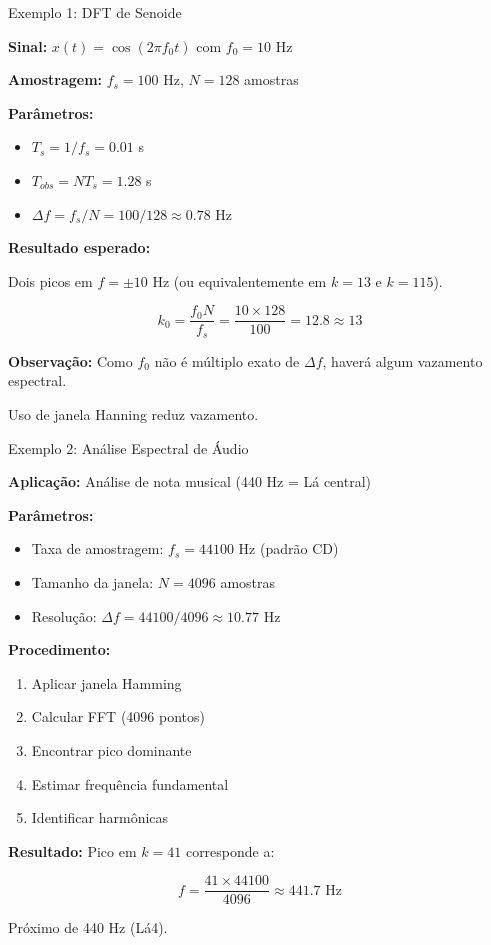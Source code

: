 \begin{frame}{Exemplo 1: DFT de Senoide}

\textbf{Sinal:} $x(t) = \cos(2\pi f_0 t)$ com $f_0 = 10$ Hz

\textbf{Amostragem:} $f_s = 100$ Hz, $N = 128$ amostras

\textbf{Parâmetros:}

\begin{itemize}
\item $T_s = 1/f_s = 0.01$ s
\item $T_{obs} = NT_s = 1.28$ s
\item $\Delta f = f_s/N = 100/128 \approx 0.78$ Hz
\end{itemize}

\textbf{Resultado esperado:}

Dois picos em $f = \pm 10$ Hz (ou equivalentemente em $k = 13$ e $k = 115$).

\[
k_0 = \frac{f_0 N}{f_s} = \frac{10 \times 128}{100} = 12.8 \approx 13
\]

\textbf{Observação:} Como $f_0$ não é múltiplo exato de $\Delta f$, haverá algum vazamento espectral.

Uso de janela Hanning reduz vazamento.

\end{frame}


\begin{frame}{Exemplo 2: Análise Espectral de Áudio}

\textbf{Aplicação:} Análise de nota musical (440 Hz = Lá central)

\textbf{Parâmetros:}

\begin{itemize}
\item Taxa de amostragem: $f_s = 44100$ Hz (padrão CD)
\item Tamanho da janela: $N = 4096$ amostras
\item Resolução: $\Delta f = 44100/4096 \approx 10.77$ Hz
\end{itemize}

\textbf{Procedimento:}

\begin{enumerate}
\item Aplicar janela Hamming
\item Calcular FFT (4096 pontos)
\item Encontrar pico dominante
\item Estimar frequência fundamental
\item Identificar harmônicas
\end{enumerate}

\textbf{Resultado:} Pico em $k = 41$ corresponde a:

\[
f = \frac{41 \times 44100}{4096} \approx 441.7 \text{ Hz}
\]

Próximo de 440 Hz (Lá4).

\end{frame}

